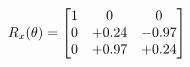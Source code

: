 \documentclass[preview]{standalone}
\begin{document}
\begin{align*}
\special{dvisvgm:raw <g id='unique000'>}R_{x}(\theta) = \begin{bmatrix}1 & 0 & 0 \\0 & +0.24 & -0.97 \\0 & +0.97 & +0.24\end{bmatrix}\special{dvisvgm:raw </g>}
\end{align*}
\end{document}
